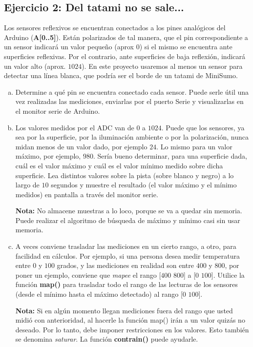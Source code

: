 \documentclass[a4paper,10pt]{article}
\begin{document}
\subsection*{Ejercicio 2: Del tatami no se sale...}

Los sensores reflexivos se encuentran conectados a los pines analógicos del Arduino (\textbf{A[0..5]}). Están polarizados de tal manera, que el pin correspondiente a un sensor indicará un valor pequeño (aprox $0$) si el mismo se encuentra ante superficies reflexivas. Por el contrario, ante superficies de baja reflexión, indicará un valor alto (aprox. $1024$).
En este proyecto usaremos al menos un sensor para detectar una línea blanca, que podría ser el borde de un tatami de MiniSumo.

\begin{enumerate}[(a)]
	\item Determine a qué pin se encuentra conectado cada sensor. Puede serle útil una vez realizadas las mediciones, enviarlas por el puerto Serie y visualizarlas en el monitor serie de Arduino.
	\item Los valores medidos por el ADC van de $0$ a $1024$. Puede que los sensores, ya sea por la superficie, por la iluminación ambiente o por la polarización, nunca midan menos de un valor dado, por ejemplo $24$. Lo mismo para un valor máximo, por ejemplo, $980$. Sería bueno determinar, para una superficie dada, cuál es el valor máximo y cuál es el valor mínimo medido sobre dicha superficie. Lea distintos valores sobre la pista (sobre blanco y negro) a lo largo de $10$ segundos y muestre el resultado (el valor máximo y el mínimo medidos) en pantalla a través del monitor serie. 
	
\textbf{Nota:} No almacene muestras a lo loco, porque se va a quedar sin memoria. Puede realizar el algoritmo de búsqueda de máximo y mínimo casi sin usar memoria.
	\item A veces conviene trasladar las mediciones en un cierto rango, a otro, para facilidad en cálculos. Por ejemplo, si una persona desea medir temperatura entre $0$ y $100$ grados, y las mediciones en realidad son entre $400$ y $800$, por poner un ejemplo, conviene que \emph{mapee} el rango [$400$ $800$] a [$0$ $100$]. Utilice la función \textbf{map()} para trasladar todo el rango de las lecturas de los sensores (desde el mínimo hasta el máximo detectado) al rango [$0$ $100$]. 
	
\textbf{Nota:} Si en algún momento llegan mediciones fuera del rango que usted midió con anterioridad, al hacerle la función map() irán a un valor quizás no deseado. Por lo tanto, debe imponer restricciones en los valores. Esto también se denomina \emph{saturar}. La función \textbf{contrain()} puede ayudarle.
	

\end{enumerate}
\end{document}
